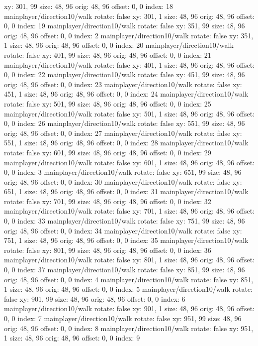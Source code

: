   xy: 301, 99
  size: 48, 96
  orig: 48, 96
  offset: 0, 0
  index: 18
mainplayer/direction10/walk
  rotate: false
  xy: 301, 1
  size: 48, 96
  orig: 48, 96
  offset: 0, 0
  index: 19
mainplayer/direction10/walk
  rotate: false
  xy: 351, 99
  size: 48, 96
  orig: 48, 96
  offset: 0, 0
  index: 2
mainplayer/direction10/walk
  rotate: false
  xy: 351, 1
  size: 48, 96
  orig: 48, 96
  offset: 0, 0
  index: 20
mainplayer/direction10/walk
  rotate: false
  xy: 401, 99
  size: 48, 96
  orig: 48, 96
  offset: 0, 0
  index: 21
mainplayer/direction10/walk
  rotate: false
  xy: 401, 1
  size: 48, 96
  orig: 48, 96
  offset: 0, 0
  index: 22
mainplayer/direction10/walk
  rotate: false
  xy: 451, 99
  size: 48, 96
  orig: 48, 96
  offset: 0, 0
  index: 23
mainplayer/direction10/walk
  rotate: false
  xy: 451, 1
  size: 48, 96
  orig: 48, 96
  offset: 0, 0
  index: 24
mainplayer/direction10/walk
  rotate: false
  xy: 501, 99
  size: 48, 96
  orig: 48, 96
  offset: 0, 0
  index: 25
mainplayer/direction10/walk
  rotate: false
  xy: 501, 1
  size: 48, 96
  orig: 48, 96
  offset: 0, 0
  index: 26
mainplayer/direction10/walk
  rotate: false
  xy: 551, 99
  size: 48, 96
  orig: 48, 96
  offset: 0, 0
  index: 27
mainplayer/direction10/walk
  rotate: false
  xy: 551, 1
  size: 48, 96
  orig: 48, 96
  offset: 0, 0
  index: 28
mainplayer/direction10/walk
  rotate: false
  xy: 601, 99
  size: 48, 96
  orig: 48, 96
  offset: 0, 0
  index: 29
mainplayer/direction10/walk
  rotate: false
  xy: 601, 1
  size: 48, 96
  orig: 48, 96
  offset: 0, 0
  index: 3
mainplayer/direction10/walk
  rotate: false
  xy: 651, 99
  size: 48, 96
  orig: 48, 96
  offset: 0, 0
  index: 30
mainplayer/direction10/walk
  rotate: false
  xy: 651, 1
  size: 48, 96
  orig: 48, 96
  offset: 0, 0
  index: 31
mainplayer/direction10/walk
  rotate: false
  xy: 701, 99
  size: 48, 96
  orig: 48, 96
  offset: 0, 0
  index: 32
mainplayer/direction10/walk
  rotate: false
  xy: 701, 1
  size: 48, 96
  orig: 48, 96
  offset: 0, 0
  index: 33
mainplayer/direction10/walk
  rotate: false
  xy: 751, 99
  size: 48, 96
  orig: 48, 96
  offset: 0, 0
  index: 34
mainplayer/direction10/walk
  rotate: false
  xy: 751, 1
  size: 48, 96
  orig: 48, 96
  offset: 0, 0
  index: 35
mainplayer/direction10/walk
  rotate: false
  xy: 801, 99
  size: 48, 96
  orig: 48, 96
  offset: 0, 0
  index: 36
mainplayer/direction10/walk
  rotate: false
  xy: 801, 1
  size: 48, 96
  orig: 48, 96
  offset: 0, 0
  index: 37
mainplayer/direction10/walk
  rotate: false
  xy: 851, 99
  size: 48, 96
  orig: 48, 96
  offset: 0, 0
  index: 4
mainplayer/direction10/walk
  rotate: false
  xy: 851, 1
  size: 48, 96
  orig: 48, 96
  offset: 0, 0
  index: 5
mainplayer/direction10/walk
  rotate: false
  xy: 901, 99
  size: 48, 96
  orig: 48, 96
  offset: 0, 0
  index: 6
mainplayer/direction10/walk
  rotate: false
  xy: 901, 1
  size: 48, 96
  orig: 48, 96
  offset: 0, 0
  index: 7
mainplayer/direction10/walk
  rotate: false
  xy: 951, 99
  size: 48, 96
  orig: 48, 96
  offset: 0, 0
  index: 8
mainplayer/direction10/walk
  rotate: false
  xy: 951, 1
  size: 48, 96
  orig: 48, 96
  offset: 0, 0
  index: 9

